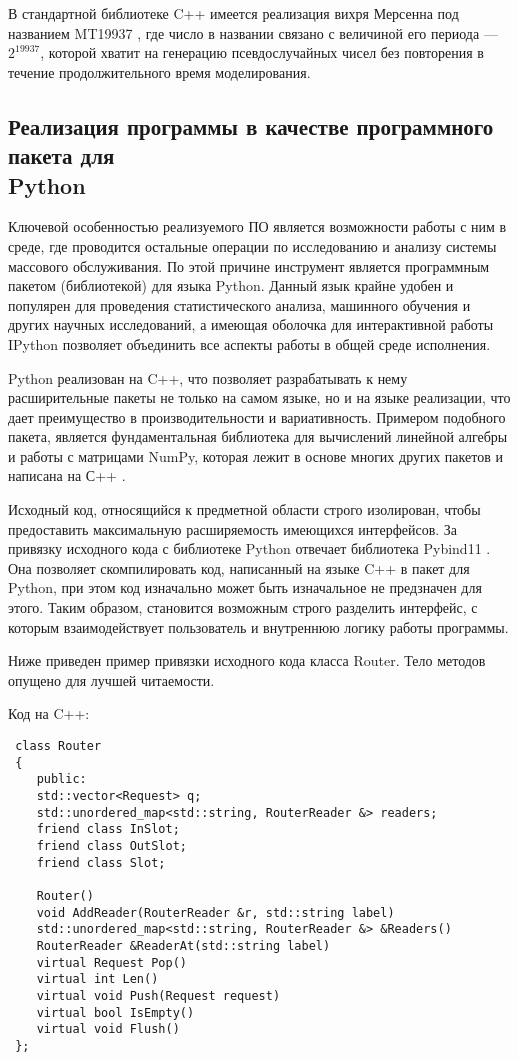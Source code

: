  В стандартной библиотеке C++ имеется реализация вихря Мерсенна под названием MT19937 \cite{mersenn}, где число в названии связано с величиной его периода --- $2^{19937}$, которой хватит на генерацию псевдослучайных чисел без повторения в течение продолжительного время моделирования.
 
 \subsection{Реализация программы в качестве программного пакета для\\ Python}
 Ключевой особенностью реализуемого ПО является возможности работы с ним в среде, где проводится остальные операции по исследованию и анализу системы массового обслуживания. По этой причине инструмент является программным пакетом (библиотекой) для языка Python. Данный язык крайне удобен и популярен для проведения статистического анализа, машинного обучения и других научных исследований, а имеющая оболочка для интерактивной работы IPython позволяет объединить все аспекты работы в общей среде исполнения.
 
 Python реализован на C++, что позволяет разрабатывать к нему расширительные пакеты не только на самом языке, но и на языке реализации, что дает преимущество в производительности и вариативность. Примером подобного пакета, является фундаментальная библиотека для вычислений линейной алгебры и работы с матрицами NumPy, которая лежит в основе многих других пакетов и написана на С++ \cite{numpy}.
 
 Исходный код, относящийся к предметной области строго изолирован, чтобы предоставить максимальную расширяемость имеющихся интерфейсов. За привязку исходного кода с библиотеке Python отвечает библиотека Pybind11 \cite{pybind}. Она позволяет скомпилировать код, написанный на языке C++ в пакет для Python, при этом код изначально может быть изначальное не предзначен для этого. Таким образом, становится возможным строго разделить интерфейс, с которым взаимодействует пользователь и внутреннюю логику работы программы.
 
 Ниже приведен пример привязки исходного кода класса Router. Тело методов опущено для лучшей читаемости.
 
 Код на C++:
 \begin{lstlisting}
 class Router
 {
 	public:
 	std::vector<Request> q;
 	std::unordered_map<std::string, RouterReader &> readers;
 	friend class InSlot;
 	friend class OutSlot;
 	friend class Slot;
 	
 	Router()
 	void AddReader(RouterReader &r, std::string label)
 	std::unordered_map<std::string, RouterReader &> &Readers()
 	RouterReader &ReaderAt(std::string label)
 	virtual Request Pop()
 	virtual int Len()
 	virtual void Push(Request request)
 	virtual bool IsEmpty()	
 	virtual void Flush()
 };
 \end{lstlisting}

